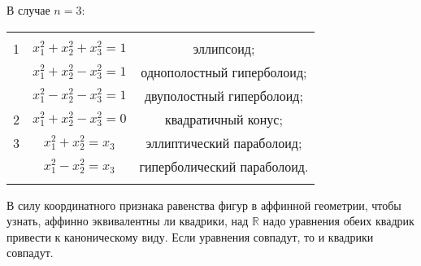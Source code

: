 \documentclass[a4paper]{article}%
\renewcommand{\c}{\mathbb{C}}
\newcommand{\eps}{\varepsilon}
\newcommand{\pr}{{\rm pr\,}}%
\renewcommand{\rk}{{\rm rk\,}}%
\renewcommand{\de}{\par\noindent\underline{Def}.\ }%
\renewcommand{\ab}{\par\noindent}%
\newcommand{\te}{\par\noindent{\bf Теорема.}\ }%
\newcommand{\dok}{\par\noindent{\textsl{Доказательство}.}\ }%
\newcommand{\qed}{\quad${{\bf Q.E.D.}}$}
\renewcommand{\phi}{\varphi}
\newcommand{\sled}{\par\noindent{\bf Следствие.}\ }%
\newcommand{\baz}[1]{\left(#1_1,\dots,#1_n\right)}%
\newcommand{\lr}{\Leftrightarrow}%
\renewcommand{\nn}[1]{#1_1,#1_2,\dots,#1_n}%
\newcommand{\lob}[1]{\left\langle#1\right\rangle}%
\newcommand{\ps}{\oplus}
\newcommand{\rom}[1]{{\rm#1\,}}
\newcommand{\op}[1]{$\mathcal{#1}$}
\renewcommand{\om}[1]{\mathcal{#1}}
\newcommand{\oi}[1]{\overrightarrow{#1}}%
\begin{document}
\ab
В случае $n=3$:\ab
\begin{tabular}{ccc}

& & \\
  1 & $x_1^2+x_2^2+x_3^2=1$ & эллипсоид; \\

   & $x_1^2+x_2^2-x_3^2=1$ & однополостный гиперболоид; \\
   & $x_1^2-x_2^2-x_3^2=1$ & двуполостный гиперболоид; \\
  2 & $x_1^2+x_2^2-x_3^2=0$ & квадратичный конус;\\
  3 & $x_1^2+x_2^2=x_3$ & эллиптический параболоид; \\
   & $x_1^2-x_2^2=x_3$ & гиперболический параболоид. \\
& & \\
\end{tabular}
\ab
В силу координатного признака равенства фигур в аффинной геометрии, чтобы узнать, аффинно эквивалентны ли квадрики,
над $\mathbb{R}$ надо уравнения обеих квадрик привести к каноническому виду. Если уравнения совпадут, то и квадрики совпадут.

%
\end{document}
